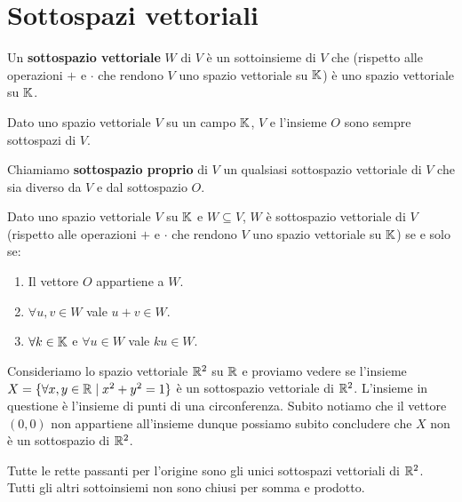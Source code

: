 \section{Sottospazi vettoriali}

\begin{definition}
	Un \textbf{sottospazio vettoriale} $W$ di $V$ è un sottoinsieme di $V$ che (rispetto alle operazioni $+$
	e $\cdot$ che rendono $V$ uno spazio vettoriale su $\mathbb{K}$) è uno spazio vettoriale su $\mathbb{K}$.
\end{definition}

\begin{example}
	Dato uno spazio vettoriale $V$ su un campo $\mathbb{K}$, $V$ e l'insieme ${O}$ sono sempre sottospazi di $V$.
\end{example}

\begin{definition}
	Chiamiamo \textbf{sottospazio proprio} di $V$ un qualsiasi sottospazio vettoriale di $V$ che sia diverso da
	$V$ e dal sottospazio ${O}$.
\end{definition}

\begin{proposition}
	Dato uno spazio vettoriale $V$ su $\mathbb{K}$ e $W \subseteq V$, $W$ è sottospazio vettoriale di $V$
	(rispetto alle operazioni $+$ e $\cdot$ che rendono $V$ uno spazio vettoriale su $\mathbb{K}$) se e solo
	se:
	\begin{enumerate}
		\item Il vettore $O$ appartiene a $W$.
		\item $\forall u, v \in W$ vale $u + v \in W$.
		\item $\forall k \in \mathbb{K}$ e $\forall u \in W$ vale $ku \in W$.
	\end{enumerate}
\end{proposition}

\begin{example}
	Consideriamo lo spazio vettoriale $\mathbb{R}^2$ su $\mathbb{R}$ e proviamo vedere se l'insieme
	$X = \{\forall x,y \in \mathbb{R} \mid x^2 + y^2 = 1\}$ è un sottospazio vettoriale di $\mathbb{R}^2$.
	L'insieme in questione è l'insieme di punti di una circonferenza. Subito notiamo che il vettore $(0, 0)$
	non appartiene all'insieme dunque possiamo subito concludere che $X$ non è un sottospazio di
	$\mathbb{R}^2$.
\end{example}

\begin{observation}
	Tutte le rette passanti per l'origine sono gli unici sottospazi vettoriali di $\mathbb{R}^2$. Tutti gli altri
	sottoinsiemi non sono chiusi per somma e prodotto.
\end{observation}


